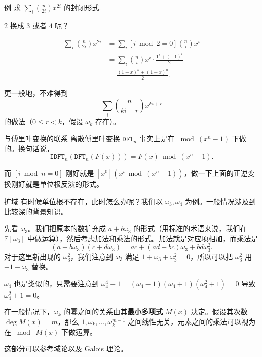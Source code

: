 \begin{frame}{例}
    求 $\sum_{i}\binom{n}{2i}x^{2i}$ 的封闭形式.

    $2$ 换成 $3$ 或者 $4$ 呢？
\end{frame}
\begin{frame}
    $$
    \begin{aligned}
    \sum_i \binom{n}{2i}x^{2i}&=\sum_i [i\bmod 2=0]\binom{n}{i}x^i\\
    &=\sum_{i}\binom{n}{i}x^i\cdot \frac{1^i+(-1)^i}{2}\\
    &=\frac{(1+x)^n+(1-x)^n}{2}.
    \end{aligned}
    $$

    更一般地，不难得到
    $$
    \sum_i \binom{n}{ki+r}x^{ki+r}
    $$
    的做法（$0\le r<k$，假设 $\omega_k$ 存在）。
\end{frame}
\begin{frame}{与傅里叶变换的联系}
    离散傅里叶变换 $\mathtt{DFT}_n$ 事实上是在 $\bmod (x^n-1)$ 下做的。换句话说，
    $$
    \mathtt{IDFT}_n(\mathtt{DFT}_n(F(x)))=F(x)\bmod(x^n-1).
    $$

    而 $[i\bmod n=0]$ 刚好就是 $[x^0](x^i\bmod(x^n-1))$，做一下上面的正逆变换刚好就是单位根反演的形式。
\end{frame}
\begin{frame}{扩域}
    有时候单位根不存在，此时怎么办呢？我们以 $\omega_3,\omega_4$ 为例。一般情况涉及到比较深的背景知识。

    先看 $\omega_3$。我们把原本的数扩充成 $a+b\omega_3$ 的形式（用标准的术语来说，我们在 $\mathbb F[\omega_3]$ 中做运算），然后考虑加法和乘法的形式。加法就是对应项相加，而乘法是
    $$
    (a+b\omega_3)(c+d\omega_3)=ac+(ad+bc)\omega_3+bd\omega_3^2.
    $$
    对于这里新出现的 $\omega_3^2$，我们注意到 $\omega_3$ 满足 $1+\omega_3+\omega_3^2=0$，所以可以把 $\omega_3^2$ 用 $-1-\omega_3$ 替换。

    $\omega_4$ 也是类似的，只需要注意到 $\omega_4^4-1=(\omega_4-1)(\omega_4+1)(\omega_4^2+1)=0$ 导致 $\omega_4^2+1=0$。
\end{frame}
\begin{frame}
    在一般情况下，$\omega_k$ 的幂之间的关系由其\textbf{最小多项式} $M(x)$ 决定。假设其次数 $\deg M(x)=m$，那么 $1,\omega_k,\ldots,\omega_k^{m-1}$ 之间线性无关，元素之间的乘法可以视为在 $\bmod\ M(x)$ 下做运算。
    
    这部分可以参考域论以及 Galois 理论。

\end{frame}
